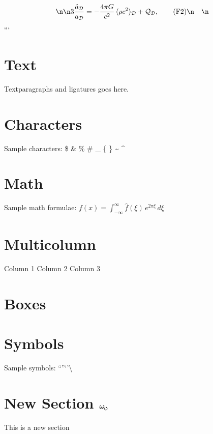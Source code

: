 \documentclass{article}
\newcommand{\swirlarrow}{%
    \mathchoice{\mkern-2mu\scriptstyle\boldsymbol{\circlearrowleft}}%
    {\mkern-2mu\scriptstyle\boldsymbol{\circlearrowleft}}%
    {\mkern-2mu\scriptscriptstyle\boldsymbol{\circlearrowleft}}%
    {\mkern-2mu\scriptscriptstyle\boldsymbol{\circlearrowleft}}%
}
\newcommand{\omegas}{\boldsymbol{\omega}_{\swirlarrow}}  %
\begin{document}
\[\n\begin{aligned}\n3\frac{\ddot a_\mathcal{D}}{a_\mathcal{D}} &= -\frac{4\pi G}{c^2}\,\langle \rho c^2 \rangle_\mathcal{D} + \mathcal{Q}_\mathcal{D}, \tag{F2}\n\end{aligned}\n\]
```



    \section{Text}
    Text\quad paragraphs and ligatures goes here.

    \section{Characters}
    Sample characters:
    \$ \& \% \# \_ \{ \} \~{} \^{}


    \section{Math}
    Sample math formulae:
    $f(x) = \int_{-\infty}^\infty \hat f(\xi)\,e^{2 \pi \xi} \, d\xi$

    \section{Multicolumn}
    \begin{multicols}{3}
        Column 1
        Column 2
        Column 3
    \end{multicols}

    \section{Boxes}
    \medbreak\noindent{}\smallbreak

    \section{Symbols}
    Sample symbols:
    \noindent \textfractionsolidus \textdiv \texttimes \textminus \textpm \textsurd \textlnot \textasteriskcentered
    \textbullet \textperiodcentered \textdagger \textdaggerdbl \textsection \textparagraph \textbardbl \textellipsis
    \textquotedblleft \textquotedblright \textquoteleft \textquoteright \textbackslash \textbullet \textemdash \textendash


\section{New Section $\omegas\quad$} This is a new section
\end{document}
